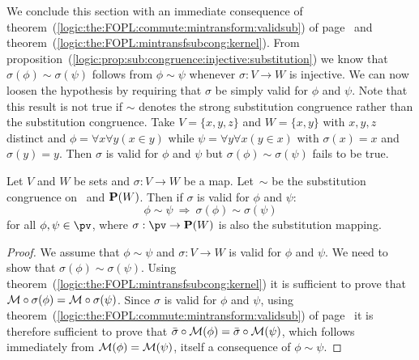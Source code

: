We conclude this section with an immediate consequence of
theorem~(\ref{logic:the:FOPL:commute:mintransform:validsub}) of
page~\pageref{logic:the:FOPL:commute:mintransform:validsub} and
theorem~(\ref{logic:the:FOPL:mintransfsubcong:kernel}). From
proposition~(\ref{logic:prop:sub:congruence:injective:substitution})
we know that $\sigma(\phi)\sim\sigma(\psi)$ follows from
$\phi\sim\psi$ whenever $\sigma:V\to W$ is injective. We can now
loosen the hypothesis by requiring that $\sigma$ be simply valid for
$\phi$ and $\psi$. Note that this result is not true if $\sim$
denotes the strong substitution congruence rather than the
substitution congruence. Take $V=\{x,y,z\}$ and $W=\{x,y\}$ with
$x,y,z$ distinct and $\phi=\forall x\forall y(x\in y)$ while
$\psi=\forall y\forall x(y\in x)$ with $\sigma(x)=x$ and
$\sigma(y)=y$. Then $\sigma$ is valid for $\phi$ and $\psi$ but
$\sigma(\phi)\sim\sigma(\psi)$ fails to be true.
\begin{theorem}\label{logic:the:FOPL:mintransfsubcong:valid}
Let $V$ and $W$ be sets and $\sigma:V\to W$ be a map. Let~$\sim$ be
the substitution congruence on \pv\ and ${\bf P}(W)$. Then if
$\sigma$ is valid for $\phi$ and $\psi$:
    \[
    \phi\sim\psi\ \Rightarrow\ \sigma(\phi)\sim\sigma(\psi)
    \]
for all $\phi,\psi\in\pv$, where $\sigma:\pv\to{\bf P}(W)$ is also
the substitution mapping.
\end{theorem}
\begin{proof}
We assume that $\phi\sim\psi$ and $\sigma:V\to W$ is valid for
$\phi$ and $\psi$. We need to show that
$\sigma(\phi)\sim\sigma(\psi)$. Using
theorem~(\ref{logic:the:FOPL:mintransfsubcong:kernel}) it is
sufficient to prove that ${\cal M}\circ\sigma(\phi)={\cal
M}\circ\sigma(\psi)$. Since $\sigma$ is valid for $\phi$ and $\psi$,
using theorem~(\ref{logic:the:FOPL:commute:mintransform:validsub})
of page~\pageref{logic:the:FOPL:commute:mintransform:validsub} it is
therefore sufficient to prove that $\bar{\sigma}\circ{\cal
M}(\phi)=\bar{\sigma}\circ{\cal M}(\psi)$, which follows immediately
from ${\cal M}(\phi)={\cal M}(\psi)$, itself a consequence of
$\phi\sim\psi$.
\end{proof}
